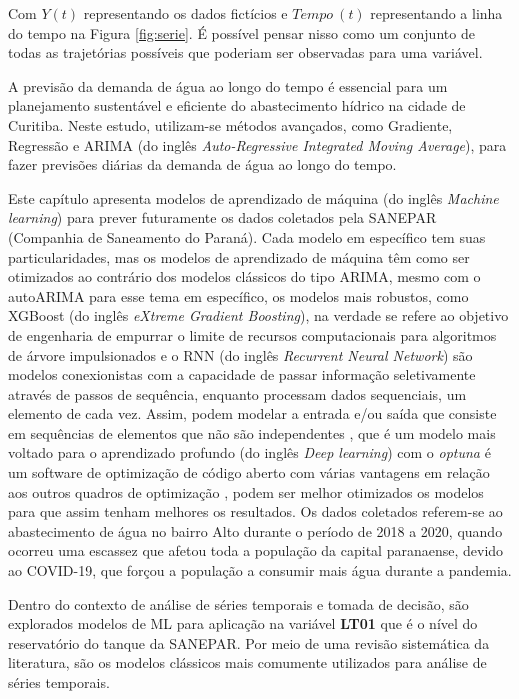 

Com $Y(t)$ representando os dados fictícios e $Tempo \ (t)$ representando a linha do tempo na Figura \ref{fig:serie}.
É possível pensar nisso como um conjunto de todas as trajetórias possíveis que poderiam ser observadas para uma variável.



A previsão da demanda de água ao longo do tempo é essencial para um planejamento sustentável e eficiente do abastecimento hídrico na cidade de Curitiba. Neste estudo, utilizam-se métodos avançados, como Gradiente, Regressão e ARIMA (do inglês \textit{Auto-Regressive Integrated Moving Average}), para fazer previsões diárias da demanda de água ao longo do tempo.


Este capítulo apresenta modelos de aprendizado de máquina (do inglês \textit{Machine learning}) para prever futuramente os dados coletados pela SANEPAR (Companhia de Saneamento do Paraná). Cada modelo em específico tem suas particularidades, mas os modelos de aprendizado de máquina têm como ser otimizados ao contrário dos modelos clássicos do tipo ARIMA, mesmo com o autoARIMA para esse tema em específico, os modelos mais robustos, como XGBoost (do inglês \textit{eXtreme Gradient Boosting}), na verdade se refere ao objetivo de engenharia de empurrar o limite de recursos computacionais para algoritmos de árvore impulsionados \cite{xgboost_intro} e o RNN (do inglês \textit{Recurrent Neural Network}) são modelos conexionistas com a capacidade de passar informação seletivamente através de passos de sequência, enquanto processam dados sequenciais, um elemento de cada vez. Assim, podem modelar a entrada e/ou saída que consiste em sequências de elementos que não são independentes \cite{rnn}, que é um modelo mais voltado para o aprendizado profundo (do inglês \textit{Deep learning}) com o \textit{optuna} é um software de optimização de código aberto com várias vantagens em relação aos outros quadros de optimização \cite{Hanifi2022}, podem ser melhor otimizados os modelos para que assim tenham melhores os resultados. Os dados coletados referem-se ao abastecimento de água no bairro Alto durante o período de 2018 a 2020, quando ocorreu uma escassez que afetou toda a população da capital paranaense, devido ao COVID-19, que forçou a população a consumir mais água durante a pandemia.

Dentro do contexto de análise de séries temporais e tomada de decisão, são explorados modelos de ML para aplicação na variável \textbf{LT01} que é o nível do reservatório do tanque da SANEPAR. Por meio de uma revisão sistemática da literatura, são os modelos clássicos mais comumente utilizados para análise de séries temporais.

